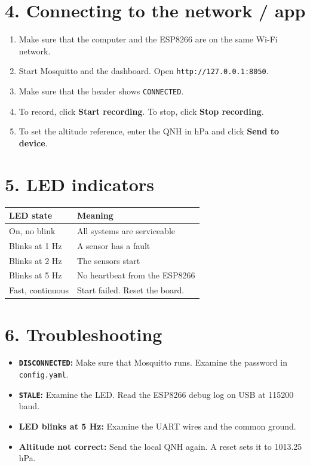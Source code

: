 \documentclass[12pt,a4paper]{report}
\begin{document}
\section*{4. Connecting to the network / app}
\begin{enumerate}
\item Make sure that the computer and the ESP8266 are on the same Wi-Fi network.
\item Start Mosquitto and the dashboard. Open \texttt{http://127.0.0.1:8050}.
\item Make sure that the header shows \texttt{CONNECTED}.
\item To record, click \textbf{Start recording}. To stop, click \textbf{Stop recording}.
\item To set the altitude reference, enter the QNH in hPa and click \textbf{Send to device}.
\end{enumerate}

\section*{5. LED indicators}
\begin{center}
\begin{tabular}{ll}
\toprule
\textbf{LED state} & \textbf{Meaning}\\
\midrule
On, no blink & All systems are serviceable\\
Blinks at 1 Hz & A sensor has a fault\\
Blinks at 2 Hz & The sensors start\\
Blinks at 5 Hz & No heartbeat from the ESP8266\\
Fast, continuous & Start failed. Reset the board.\\
\bottomrule
\end{tabular}
\end{center}

\section*{6. Troubleshooting}
\begin{itemize}
\item \textbf{\texttt{DISCONNECTED}:} Make sure that Mosquitto runs. Examine the password in \texttt{config.yaml}.
\item \textbf{\texttt{STALE}:} Examine the LED. Read the ESP8266 debug log on USB at 115200 baud.
\item \textbf{LED blinks at 5 Hz:} Examine the UART wires and the common ground.
\item \textbf{Altitude not correct:} Send the local QNH again. A reset sets it to 1013.25 hPa.
\end{itemize}
\end{document}
